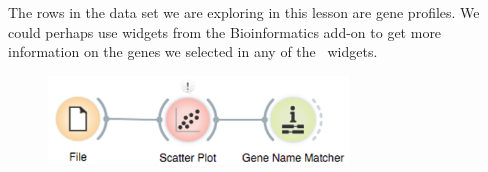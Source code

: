The rows in the data set we are exploring in this lesson are gene profiles. We could perhaps use widgets from the Bioinformatics add-on to get more information on the genes we selected in any of the \mutation\ widgets.


\begin{figure}[h]
  \flushright
  \includegraphics[width=80mm]{workflow-fig7.png}%
\label{fig:workflow-fig7}%
\end{figure}
